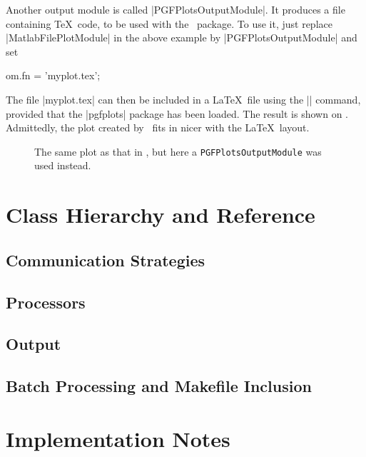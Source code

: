 Another output module is called |PGFPlotsOutputModule|. It produces a file
containing \TeX\ code, to be used with the \pgfplots\ package. To use it, just
replace |MatlabFilePlotModule| in the above example by |PGFPlotsOutputModule|
and set \eg
\begin{Code}
  om.fn = 'myplot.tex';
\end{Code}
The file |myplot.tex| can then be included in a \LaTeX\ file using the ||
command, provided that the |pgfplots| package has been loaded.  The result is
shown on . Admittedly, the plot created by \pgfplots\ fits in
nicer with the \LaTeX\ layout.

\begin{figure}
  \begin{center}
    
  \end{center}
  \caption{The same plot as that in , but here a
  \texttt{PGFPlotsOutputModule} was used instead.}
  \label{fig:uncodedpgf}
\end{figure}


\section{Class Hierarchy and Reference}

\subsection{Communication Strategies}

\subsection{Processors}

\subsection{Output}

\subsection{Batch Processing and Makefile Inclusion}


\section{Implementation Notes}

